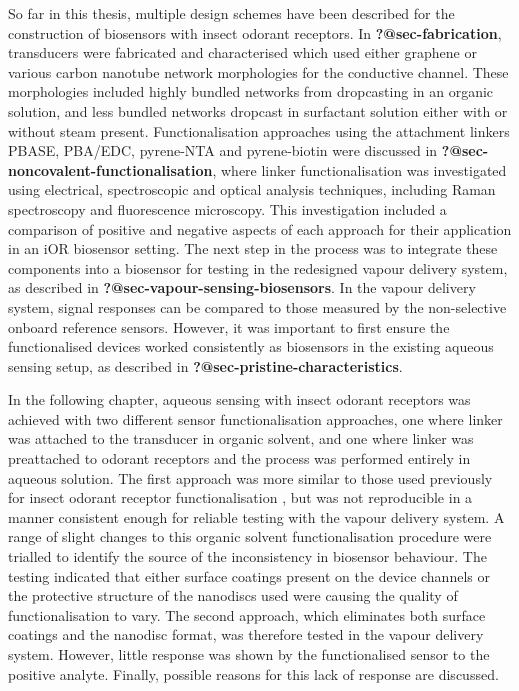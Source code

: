 \documentclass[
  a4paper,
]{scrbook}
\begin{document}
So far in this thesis, multiple design schemes have been described for
the construction of biosensors with insect odorant receptors. In
\textbf{?@sec-fabrication}, transducers were fabricated and
characterised which used either graphene or various carbon nanotube
network morphologies for the conductive channel. These morphologies
included highly bundled networks from dropcasting in an organic
solution, and less bundled networks dropcast in surfactant solution
either with or without steam present. Functionalisation approaches using
the attachment linkers PBASE, PBA/EDC, pyrene-NTA and pyrene-biotin were
discussed in \textbf{?@sec-noncovalent-functionalisation}, where linker
functionalisation was investigated using electrical, spectroscopic and
optical analysis techniques, including Raman spectroscopy and
fluorescence microscopy. This investigation included a comparison of
positive and negative aspects of each approach for their application in
an iOR biosensor setting. The next step in the process was to integrate
these components into a biosensor for testing in the redesigned vapour
delivery system, as described in
\textbf{?@sec-vapour-sensing-biosensors}. In the vapour delivery system,
signal responses can be compared to those measured by the non-selective
onboard reference sensors. However, it was important to first ensure the
functionalised devices worked consistently as biosensors in the existing
aqueous sensing setup, as described in
\textbf{?@sec-pristine-characteristics}.

In the following chapter, aqueous sensing with insect odorant receptors
was achieved with two different sensor functionalisation approaches, one
where linker was attached to the transducer in organic solvent, and one
where linker was preattached to odorant receptors and the process was
performed entirely in aqueous solution. The first approach was more
similar to those used previously for insect odorant receptor
functionalisation \autocite{Murugathas2019a,Murugathas2020}, but was not
reproducible in a manner consistent enough for reliable testing with the
vapour delivery system. A range of slight changes to this organic
solvent functionalisation procedure were trialled to identify the source
of the inconsistency in biosensor behaviour. The testing indicated that
either surface coatings present on the device channels or the protective
structure of the nanodiscs used were causing the quality of
functionalisation to vary. The second approach, which eliminates both
surface coatings and the nanodisc format, was therefore tested in the
vapour delivery system. However, little response was shown by the
functionalised sensor to the positive analyte. Finally, possible reasons
for this lack of response are discussed.
\end{document}
